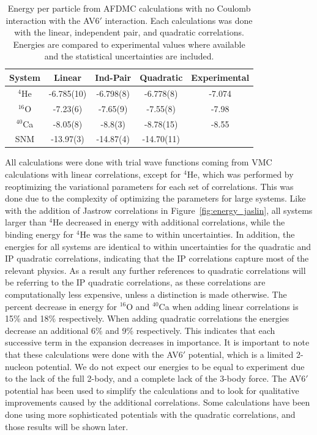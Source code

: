 \begin{table}[htb]
   \centering
   \begin{tabular}{ccccc}
      \hline\hline
      System & Linear & Ind-Pair & Quadratic & Experimental \\
      \hline
      $^4${He}    & -6.785(10)   & -6.798(8) & -6.778(8)    & -7.074 \\   
      $^{16}${O}  & -7.23(6)     & -7.65(9)  & -7.55(8)     & -7.98  \\   
      $^{40}${Ca} & -8.05(8)     & -8.8(3)   & -8.78(15)    & -8.55  \\
      SNM         & -13.97(3)    & -14.87(4) & -14.70(11)   &        \\
      \hline\hline
   \end{tabular}
   \caption{Energy per particle from AFDMC calculations with no Coulomb interaction with the AV6$'$ interaction. Each calculations was done with the linear, independent pair, and quadratic correlations. Energies are compared to experimental values where available and the statistical uncertainties are included.}
   \label{tab:energies}
\end{table}
All calculations were done with trial wave functions coming from VMC calculations with linear correlations, except for $^4$He, which was performed by reoptimizing the variational parameters for each set of correlations. This was done due to the complexity of optimizing the parameters for large systems. Like with the addition of Jastrow correlations in Figure~\ref{fig:energy_jaslin}, all systems larger than $^4$He decreased in energy with additional correlations, while the binding energy for $^4$He was the same to within uncertainties. In addition, the energies for all systems are identical to within uncertainties for the quadratic and IP quadratic correlations, indicating that the IP correlations capture most of the relevant physics. As a result any further references to quadratic correlations will be referring to the IP quadratic correlations, as these correlations are computationally less expensive, unless a distinction is made otherwise. The percent decrease in energy for $^{16}$O and $^{40}$Ca when adding linear correlations is 15\% and 18\% respectively. When adding quadratic correlations the energies decrease an additional 6\% and 9\% respectively. This indicates that each successive term in the expansion decreases in importance. It is important to note that these calculations were done with the AV6$'$ potential, which is a limited 2-nucleon potential. We do not expect our energies to be equal to experiment due to the lack of the full 2-body, and a complete lack of the 3-body force. The AV6$'$ potential has been used to simplify the calculations and to look for qualitative improvements caused by the additional correlations. Some calculations have been done using more sophisticated potentials with the quadratic correlations, and those results will be shown later.

